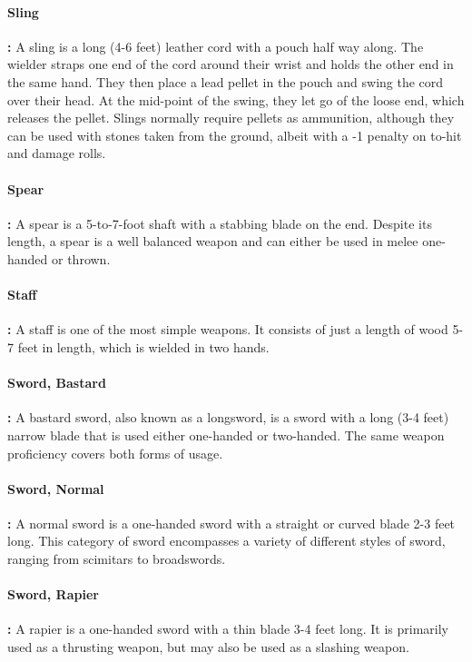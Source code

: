 \begin{multicols*}{2}
\paragraph{Sling}\textbf{:} A sling is a long (4-6 feet) leather cord with a pouch half way along. The wielder straps one end of the cord around their wrist and holds the other end in the same hand. They then place a lead pellet in the pouch and swing the cord over their head. At the mid-point of the swing, they let go of the loose end, which releases the pellet. Slings normally require pellets as ammunition, although they can be used with stones taken from the ground, albeit with a -1 penalty on to-hit and damage rolls.

\paragraph{Spear}\textbf{:} A spear is a 5-to-7-foot shaft with a stabbing blade on the end. Despite its length, a spear is a well balanced weapon and can either be used in melee one-handed or thrown.

\paragraph{Staff}\textbf{:} A staff is one of the most simple weapons. It consists of just a length of wood 5-7 feet in length, which is wielded in two hands.

\paragraph{Sword, Bastard}\textbf{:} A bastard sword, also known as a longsword, is a sword with a long (3-4 feet) narrow blade that is used either one-handed or two-handed. The same weapon proficiency covers both forms of usage.

\paragraph{Sword, Normal}\textbf{:} A normal sword is a one-handed sword with a straight or curved blade 2-3 feet long. This category of sword encompasses a variety of different styles of sword, ranging from scimitars to broadswords.

\paragraph{Sword, Rapier}\textbf{:} A rapier is a one-handed sword with a thin blade 3-4 feet long. It is primarily used as a thrusting weapon, but may also be used as a slashing weapon.


\end{multicols*}
